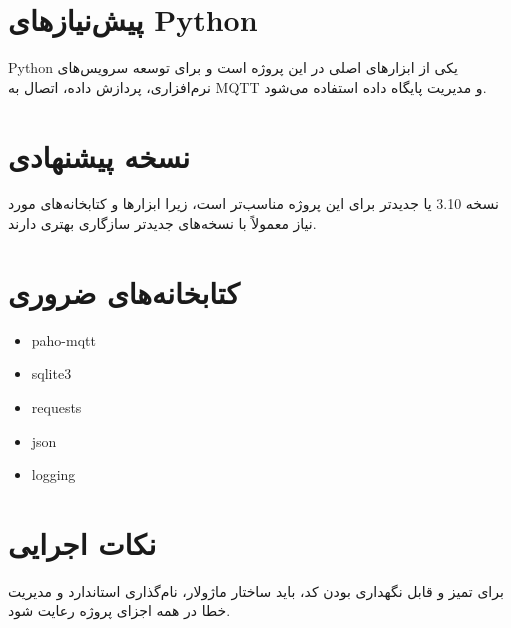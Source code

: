 \section{پیش‌نیازهای Python}

Python یکی از ابزارهای اصلی در این پروژه است و برای توسعه سرویس‌های نرم‌افزاری، پردازش داده، اتصال به MQTT و مدیریت پایگاه داده استفاده می‌شود.

\section{نسخه پیشنهادی}

نسخه 3.10 یا جدیدتر برای این پروژه مناسب‌تر است، زیرا ابزارها و کتابخانه‌های مورد نیاز معمولاً با نسخه‌های جدیدتر سازگاری بهتری دارند.

\section{کتابخانه‌های ضروری}

\begin{itemize}
    \item paho-mqtt
    \item sqlite3
    \item requests
    \item json
    \item logging
\end{itemize}

\section{نکات اجرایی}

برای تمیز و قابل نگهداری بودن کد، باید ساختار ماژولار، نام‌گذاری استاندارد و مدیریت خطا در همه اجزای پروژه رعایت شود.
